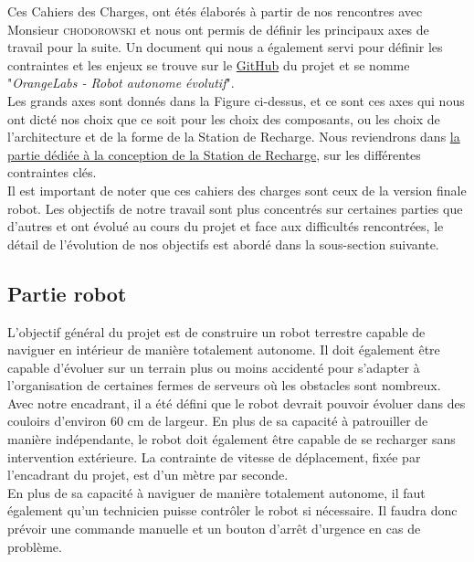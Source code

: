 \documentclass[french]{rapportENSTAB}
\begin{document}
Ces Cahiers des Charges, ont étés élaborés à partir de nos rencontres avec Monsieur \textsc{chodorowski} et nous ont permis de définir les principaux axes de travail pour la suite. Un document qui nous a également servi pour définir les contraintes et les enjeux se trouve sur le  \href{https://github.com/AntoninLize/Projet_OrangeLabs}{GitHub} du projet et se nomme "\textit{OrangeLabs - Robot autonome évolutif}".\\

Les grands axes sont donnés dans la Figure ci-dessus, et ce sont ces axes qui nous ont dicté nos choix que ce soit pour les choix des composants, ou les choix de l'architecture et de la forme de la Station de Recharge. Nous reviendrons dans \hyperlink{partie_station2recharge}{la partie dédiée à la conception de la Station de Recharge}, sur les différentes contraintes clés.\\


Il est important de noter que ces cahiers des charges sont ceux de la version finale robot. Les objectifs de notre travail sont plus concentrés sur certaines parties que d'autres et ont évolué au cours du projet et face aux difficultés rencontrées, le  détail de l'évolution de nos objectifs est abordé dans la sous-section suivante. \\ 

\subsection{Partie robot}

L'objectif général du projet est de construire un robot terrestre capable de naviguer en intérieur de manière totalement autonome. Il doit également être capable d'évoluer sur un terrain plus ou moins accidenté pour s'adapter à l'organisation de certaines fermes de serveurs où les obstacles sont nombreux. Avec notre encadrant, il a été défini que le robot devrait pouvoir évoluer dans des couloirs d'environ 60 cm de largeur. En plus de sa capacité à patrouiller de manière indépendante, le robot doit également être capable de se recharger sans intervention extérieure. La contrainte de vitesse de déplacement,  fixée par l'encadrant du projet, est d'un mètre par seconde. \\

En plus de sa capacité à naviguer de manière totalement autonome, il faut également qu'un technicien puisse contrôler le robot si nécessaire. Il faudra donc prévoir une commande manuelle et un bouton d'arrêt d'urgence en cas de problème. \\
\end{document}
